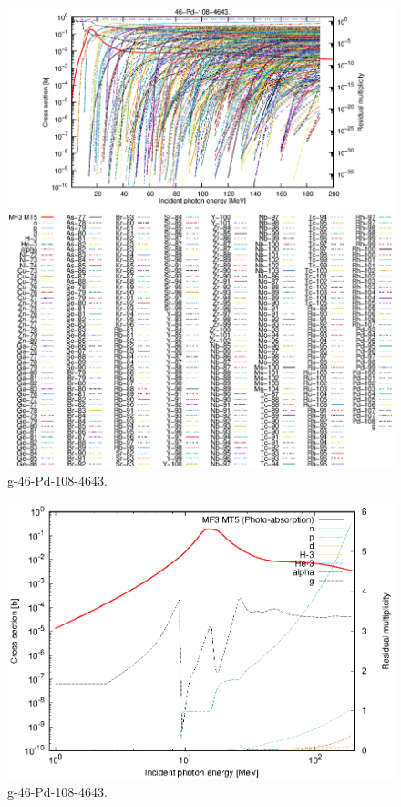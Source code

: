 \begin{figure}
 \includegraphics[width=\linewidth]{eps/g_46-Pd-108_4643.eps}
  \caption{g-46-Pd-108-4643.}
\end{figure}
\newpage \clearpage

\begin{figure}
 \includegraphics[width=\linewidth]{eps-log/g_46-Pd-108_4643.eps}
 \caption{g-46-Pd-108-4643.}
\end{figure}
\newpage \clearpage

